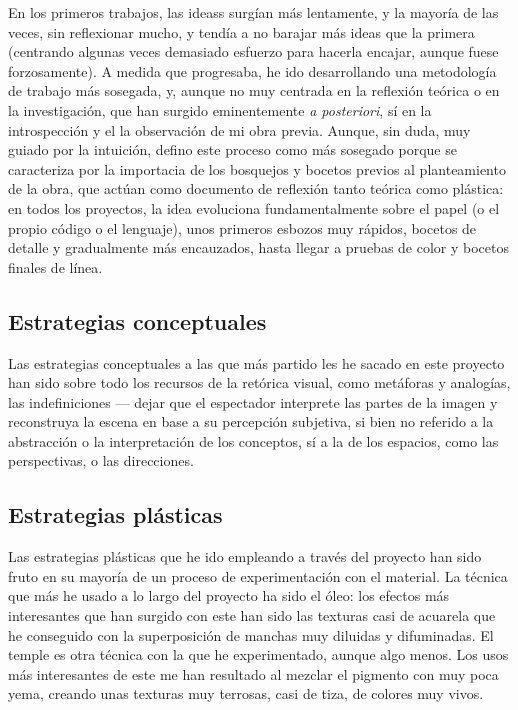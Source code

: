 \documentclass[twoside]{article}
\begin{document}
\begin{multicols}{2}
  En los primeros trabajos, las ideass surgían más lentamente, y la
  mayoría de las veces, sin reflexionar mucho, y tendía a no barajar más
  ideas que la primera (centrando algunas veces demasiado esfuerzo para
  hacerla encajar, aunque fuese forzosamente). A medida que progresaba, he
  ido desarrollando una metodología de trabajo más sosegada, y, aunque no
  muy centrada en la reflexión teórica o en la investigación, que han
  surgido eminentemente \emph{a posteriori}, sí en la introspección y el
  la observación de mi obra previa. Aunque, sin duda, muy guiado por la
  intuición, defino este proceso como más sosegado porque se caracteriza
  por la importacia de los bosquejos y bocetos previos al planteamiento de
  la obra, que actúan como documento de reflexión tanto teórica como
  plástica: en todos los proyectos, la idea evoluciona fundamentalmente
  sobre el papel (o el propio código o el lenguaje), unos primeros esbozos
  muy rápidos, bocetos de detalle y gradualmente más encauzados, hasta
  llegar a pruebas de color y bocetos finales de línea.

  \hypertarget{estrategias-conceptuales}{%
    \subsection{Estrategias conceptuales}\label{estrategias-conceptuales}}

  Las estrategias conceptuales a las que más partido les he sacado en este
  proyecto han sido sobre todo los recursos de la retórica visual, como
  metáforas y analogías, las indefiniciones --- dejar que el espectador
  interprete las partes de la imagen y reconstruya la escena en base a su
  percepción subjetiva, si bien no referido a la abstracción o la
  interpretación de los conceptos, sí a la de los espacios, como las
  perspectivas, o las direcciones.

  \hypertarget{estrategias-pluxe1sticas}{%
    \subsection{Estrategias plásticas}\label{estrategias-pluxe1sticas}}

  Las estrategias plásticas que he ido empleando a través del proyecto han
  sido fruto en su mayoría de un proceso de experimentación con el
  material. La técnica que más he usado a lo largo del proyecto ha sido el
  óleo: los efectos más interesantes que han surgido con este han sido las
  texturas casi de acuarela que he conseguido con la superposición de
  manchas muy diluidas y difuminadas. El temple es otra técnica con la que
  he experimentado, aunque algo menos. Los usos más interesantes de este
  me han resultado al mezclar el pigmento con muy poca yema, creando unas
  texturas muy terrosas, casi de tiza, de colores muy vivos.


\end{multicols}
\end{document}
